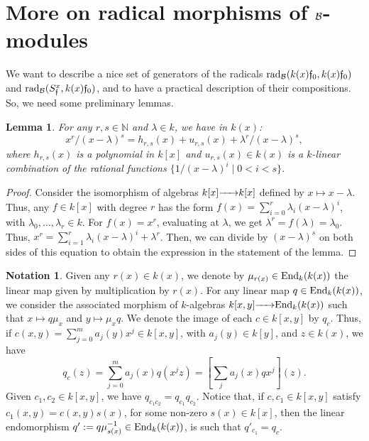 \documentclass{article}
\newtheorem{lemma}[theorem]{Lemma}
\theoremstyle{definition}
\newtheorem{notation}[theorem]{Notation}
\newcommand{\End}{{ \rm End }}
\newcommand{\rad}{{ \rm rad }}
\renewcommand{\frak}{\mathfrak}
\newcommand{\hueca}[1]{\mathbb{#1}}
\newcommand{\rightmap}[1]{\smash{\mathop{\hbox to 
20pt{\rightarrowfill}}\limits^{#1}}}
\begin{document}
\section{More on radical morphisms of ${\cal B}$-modules}

We want to describe a nice  set of generators of the radicals $\rad_{\cal B}(k(x)\frak{f}_0,k(x)\frak{f}_0)$ and $\rad_{\cal B}(S^x_{\frak{f}},k(x)\frak{f}_0)$, and to have a practical description of their compositions. So, we need some preliminary lemmas. 

\begin{lemma}\label{L: cocientes combin lin de basicos en k(x)} For any $r,s\in \hueca{N}$ and $\lambda\in k$, we have in $k(x)$: 
$$x^r/(x-\lambda)^s=h_{r,s}(x)+u_{r,s}(x)+\lambda^r/(x-\lambda)^s,$$
where $h_{r,s}(x)$ is a polynomial in $k[x]$ and $u_{r,s}(x)\in k(x)$ is a $k$-linear combination of the rational functions $\{1/(x-\lambda)^i\mid 0<i<s\}$. 
\end{lemma}

\begin{proof} Consider the isomorphism of algebras $k[x]\rightmap{}k[x]$ defined by $x\mapsto x-\lambda$. Thus, any  $f\in k[x]$ with degree $r$   
has the form $f(x)=\sum_{i=0}^r\lambda_i(x-\lambda)^i$, with $\lambda_0,\ldots,\lambda_r\in k$. For $f(x)=x^r$, evaluating at $\lambda$, we get $\lambda^r=f(\lambda)=\lambda_0$. Thus, $x^r=\sum_{i=1}^r\lambda_i(x-\lambda)^i+\lambda^r$. Then, we can divide by $(x-\lambda)^s$ on both sides of this equation to obtain  the expression in the statement of the lemma. 
\end{proof}

\begin{notation}\label{N: def de qsubc} Given any $r(x)\in k(x)$, we denote by $\mu_{r(x)}\in \End_k(k(x))$ the linear map given by multiplication by $r(x)$. 
For any linear map $q\in \End_k(k(x))$, we consider the associated morphism of $k$-algebras $k[x,y]\rightmap{}\End_k(k(x))$ such that $x\mapsto q\mu_x$ and $y\mapsto \mu_xq$. 
We denote the image of each $c\in k[x,y]$ by $q_c$. Thus, if $c(x,y)=\sum_{j=0}^ma_j(y)x^j\in k[x,y]$, with $a_j(y)\in k[y]$, and $z\in k(x)$, we have 
$$q_c(z)=\sum_{j=0}^ma_j(x)q(x^jz)=\left[\sum_ja_j(x)qx^j\right](z).$$
Given $c_1,c_2\in k[x,y]$, we have 
$q_{c_1c_2}=q_{c_1}q_{c_2}$. 
 Notice that, if $c,c_1\in k[x,y]$ satisfy $c_1(x,y)=c(x,y)s(x)$, for some non-zero $s(x)\in k[x]$, then the linear endomorphism  $q':=q\mu_{s(x)}^{-1}\in \End_k(k(x))$, is such that   $q'_{c_1}=q_c$. 
\end{notation}
\end{document}
